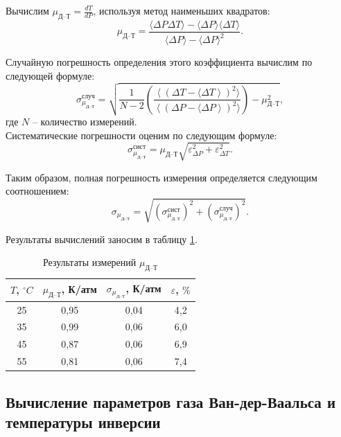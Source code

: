 \documentclass[a4paper, 12pt]{article}
\begin{document}
    \noindent Вычислим $\mu_\text{Д--Т} = \frac{dT}{dP}$, используя метод наименьших квадратов: \[ \mu_\text{Д--Т} = \frac{\langle \Delta P \Delta T \rangle - \langle \Delta P \rangle \langle \Delta T \rangle}{\langle \Delta P \rangle - \langle \Delta P \rangle ^2}.\]

    \noindent Случайную погрешность определения этого коэффициента вычислим по следующей формуле: \[ \sigma^\text{случ}_{\mu_\text{Д--Т}} = \sqrt{\frac{1}{N-2} \left(\frac{\left\langle\left(\Delta T - \langle \Delta T\right\rangle\right)^2 \rangle}{\left\langle\left(\Delta P - \langle \Delta P\right\rangle\right)^2 \rangle}\right)-\mu_\text{Д--Т}^2},\] где  $N$  -- количество измерений.\\

    \noindent Систематические погрешности оценим по следующим формуле: \[ \sigma^\text{сист}_{\mu_\text{Д--Т}} = {\mu_\text{Д--Т}}\sqrt{\varepsilon^2_{\Delta P}+\varepsilon^2_{\Delta T}}.\]
    
    \noindent Таким образом, полная погрешность измерения определяется следующим соотношением: \[ \sigma_{\mu_\text{Д--Т}} = \sqrt{(\sigma_{\mu_\text{Д--Т}}^\text{сист})^2 + (\sigma_{\mu_\text{Д--Т}}^\text{случ})^2}.\]

    \noindent Результаты вычислений заносим в таблицу \ref{tab:my-table}.
    
    \begin{table}[H]
        \centering
        \begin{tabular}{|c|c|c|c|}
            \hline
            $T$, $ ^\circ C $ & $\mu_\text{Д--Т}$, К/атм & $\sigma_{\mu_\text{Д--Т}}$, К/атм & $\varepsilon$, $\%$  \\ \hline
            25 & 0,95 & 0,04 & 4,2 \\ \hline
            35 & 0,99 & 0,06 & 6,0 \\ \hline
            45 & 0,87 & 0,06 & 6,9 \\ \hline
            55 & 0,81 & 0,06 & 7,4 \\ \hline
        \end{tabular}
        \caption{Результаты измерений $ \mu_\text{Д--Т} $}
        \label{tab:my-table}
    \end{table}

    \subsection*{Вычисление параметров газа Ван-дер-Ваальса и температуры инверсии}
\end{document}
